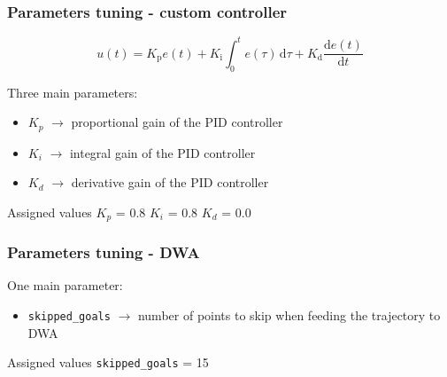\documentclass{beamer}
\begin{document}
\begin{frame}
\frametitle{Parameters tuning - custom controller}

$$
u(t)=K_{\text{p}}e(t)+K_{\text{i}}\int _{0}^{t}e(\tau )\,\mathrm {d} \tau +K_{\text{d}}{\frac {\mathrm {d} e(t)}{\mathrm {d} t}}
$$

\vspace{2em}

Three main parameters:
\begin{itemize}
 \item $K_p$ $\rightarrow$ proportional gain of the PID controller
 \item $K_i$ $\rightarrow$ integral gain of the PID controller
 \item $K_d$ $\rightarrow$ derivative gain of the PID controller
\end{itemize}

\vspace{2em}

\begin{block}{Assigned values}
\centering
$K_p$ = 0.8
\hspace{3em}
$K_i$ = 0.8
\hspace{3em}
$K_d$ = 0.0
\end{block}

\end{frame}


\begin{frame}
\frametitle{Parameters tuning - DWA}

One main parameter:
\begin{itemize}
  \item \texttt{skipped\_goals} $\rightarrow$ number of points to skip when feeding the trajectory to DWA
\end{itemize}

\vspace{2em}

\begin{block}{Assigned values}
\centering
\texttt{skipped\_goals} = 15
\end{block}

\end{frame}



\end{document}
